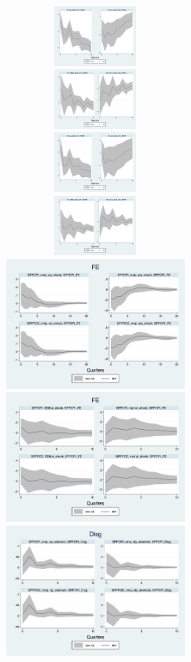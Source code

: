 \documentclass[]{article}
\begin{document}
\begin{figure}[h]\label{ReplicateCoibionBefore2007}
	\centering
	\includegraphics[width=6cm,height=2cm]{figures/CPIAU_ashocks_nmp.png}  
	\includegraphics[width=6cm,height=2cm]{figures/CPIAU_ashocks.png} \\
	\includegraphics[width=6cm,height=2cm]{figures/PCEPI_ashocks_nmp.png} 
	\includegraphics[width=6cm,height=2cm]{figures/PCEPI_ashocks.png}  \\
	\smallskip
	\includegraphics[width=6cm]{figures/SPFFE_ashocks_nmp.png} 
		\includegraphics[width=6cm]{figures/SPFFE_ashocks.png} \\
	\smallskip
	\includegraphics[width=6cm]{figures/SPFDisg_ab_ashocks_nmp.png} 

\end{figure}
\end{document}
